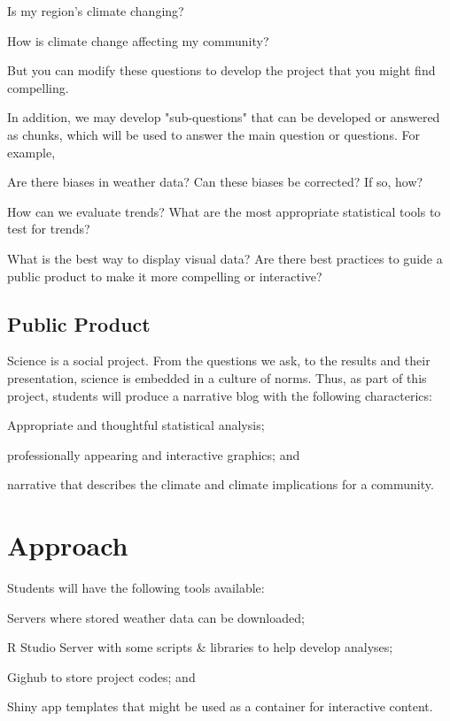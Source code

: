 \documentclass{article}\usepackage[]{graphicx}\usepackage[]{color}
\newenvironment{itemize*}%
  {\begin{itemize}%
    \setlength{\itemsep}{0pt}%
    \setlength{\parskip}{0pt}}%
  {\end{itemize}}
\begin{document}
\begin{itemize*}
  \item Is my region's climate changing?
  \item How is climate change affecting my community?
\end{itemize*}

But you can modify these questions to develop the project that you might find compelling.

In addition, we may develop "sub-questions" that can be developed or answered as chunks, which will be used to answer the main question or questions. For example, 

\begin{itemize*}
  \item Are there biases in weather data? Can these biases be corrected? If so, how?
  \item How can we evaluate trends? What are the most appropriate statistical tools to test for trends?
  \item What is the best way to display visual data?  Are there best practices to guide a public product to make it more compelling or interactive?
\end{itemize*}

\subsection{Public Product}

Science is a social project. From the questions we ask, to the results and their presentation, science is embedded in a culture of norms. Thus, as part of this project, students will produce a narrative blog with the following characterics:

\begin{itemize*}
  \item Appropriate and thoughtful statistical analysis;
  \item professionally appearing and interactive graphics; and 
  \item narrative that describes the climate and climate implications for a community.
\end{itemize*}

\section{Approach}

Students will have the following tools available:

\begin{itemize*}
  \item Servers where stored weather data can be downloaded;
  \item R Studio Server with some scripts \& libraries to help develop analyses;
  \item Gighub to store project codes; and
  \item Shiny app templates that might be used as a container for interactive content.
\end{itemize*}
\end{document}
